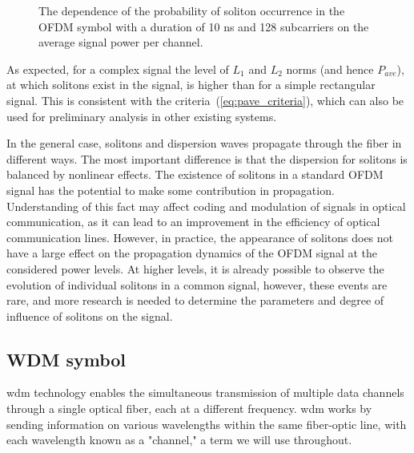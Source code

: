 \begin{figure}[htpb]
    \caption{The dependence of the probability of soliton occurrence in the OFDM symbol with a duration of 10 ns and 128 subcarriers on the average signal power per channel.}
    \label{fig:ofdm_result_sub_128}
\end{figure}

As expected, for a complex signal the level of $L_1$ and $L_2$ norms (and hence $P_ {ave}$), at which solitons exist in the signal, is higher than for a simple rectangular signal. This is consistent with the criteria~(\ref{eq:pave_criteria}), which can also be used for preliminary analysis in other existing systems. 

In the general case, solitons and dispersion waves propagate through the fiber in different ways. The most important difference is that the dispersion for solitons is balanced by nonlinear effects. The existence of solitons in a standard OFDM signal has the potential to make some contribution in propagation. Understanding of this fact may affect coding and modulation of signals in optical communication, as it can lead to an improvement in the efficiency of optical communication lines. However, in practice, the appearance of solitons does not have a large effect on the propagation dynamics of the OFDM signal at the considered power levels. At higher levels, it is already possible to observe the evolution of individual solitons in a common signal, however, these events are rare, and more research is needed to determine the parameters and degree of influence of solitons on the signal.

\clearpage

\subsection{WDM symbol} 

\Gls{wdm} technology enables the simultaneous transmission of multiple data channels through a single optical fiber, each at a different frequency. \Gls{wdm} works by sending information on various wavelengths within the same fiber-optic line, with each wavelength known as a "channel," a term we will use throughout.

